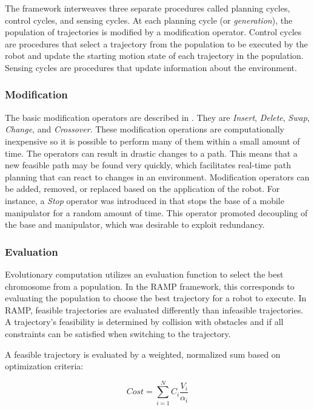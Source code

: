 \documentclass[10pt,conference]{ieeeconf}
\begin{document}
The framework interweaves three separate procedures called planning cycles, control cycles, and sensing cycles. At each planning cycle (or \emph{generation}), the population of trajectories is modified by a modification operator. Control cycles are procedures that select a trajectory from the population to be executed by the robot and update the starting motion state of each trajectory in the population. Sensing cycles are procedures that update information about the environment.


\subsubsection{Modification}


The basic modification operators are described in \cite{EPN_Adaptive}. They are \emph{Insert}, \emph{Delete}, \emph{Swap}, \emph{Change}, and \emph{Crossover}. These modification operations are computationally inexpensive so it is possible to perform many of them within a small amount of time. The operators can result in drastic changes to a path. This means that a new feasible path may be found very quickly, which facilitates real-time path planning that can react to changes in an environment. Modification operators can be added, removed, or replaced based on the application of the robot. For instance, a \emph{Stop} operator was introduced in \cite{RAMP} that stops the base of a mobile manipulator for a random amount of time. This operator promoted decoupling of the base and manipulator, which was desirable to exploit redundancy. 


\subsubsection{Evaluation}

Evolutionary computation utilizes an evaluation function to select the best chromosome from a population. In the RAMP framework, this corresponds to evaluating the population to choose the best trajectory for a robot to execute. In RAMP, feasible trajectories are evaluated differently than infeasible trajectories. A trajectory's feasibility is determined by collision with obstacles and if all constraints can be satisfied when switching to the trajectory.

A feasible trajectory is evaluated by a weighted, normalized sum based on optimization criteria:

\begin{equation}
	Cost = \sum_{i=1}^{N} C_i\frac{V_i}{\alpha_i}
\end{equation}
\end{document}
